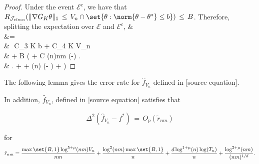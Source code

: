 \documentclass[twoside,11pt]{article}
\makeatletter
\newcommand{\rev}[1]{{\color{revisionred}#1}}
\newcommand{\discardlabel}[1]{}
\newcommand{\discardtwo}[2]{}
\newcommand{\legacyref}[1]{\textup{[source ref.]}}
\newcommand{\legacyeqref}[1]{\textup{[source equation]}}
\newenvironment{legacycomparison}{%
  \begingroup\color{legacygray}%
  \let\label\discardlabel
  \let\originallabel\discardlabel
  \let\ref\legacyref
  \let\pageref\legacyref
  \let\eqref\legacyeqref
  \let\cref\legacyref
  \let\Cref\legacyref
  \let\autoref\legacyref
  \let\aliasref\discardtwo
}{\endgroup}
\newcommand{\aliasref}[2]{%
  \@ifundefined{r@#2}{}{%
    \expandafter\let\csname r@#1\expandafter\endcsname\csname r@#2\endcsname}}
\makeatother
\begin{document}
\begin{legacycomparison}
\begin{proof}
Under the event $\mathcal{E}^c$, we have that $R_{\mathcal{J}_{elmn}} ( \|\nabla{G_K} \theta\|_1 \,\leq\, V_n\cap \set{\theta: \norm{\theta-\theta^*} \leq  b}) \,\leq\, B$. Therefore, splitting the expectation over $\mathcal{E}$ and $\mathcal{E}^c$, 
\bea 
&   \\ &=\\
&\,\leq\, 
C_3  K b + C_4  K V_n \\
& \quad +  B  \cdot \left( + C \log(n)nm \exp\left(-\right) \right. \\ & \left. \quad +  +  \log(n) \exp\left(- \right)  + \right)
\bea 


\end{proof}




\rev{The following lemma} gives the error rate for $\hat{f}_{V_n}$ defined in \eqref{np_knn2}. 



    



\begin{lemma}
\label{knn_f}
In addition, \( \hat{f}_{V_n} \), defined in \eqref{np_knn2} satisfies that

\[
\Delta^2(\hat{f}_{V_n} - f^*) \,=\, O_p(\tilde{r}_{nm})
\]

for
\[
\tilde{r}_{nm} =  \frac{ \max\set{B,1} \log^{5+\mu}(nm)V_n}{nm} + \frac{\log^2(nm)\max\set{B,1}}{n}
+ \frac{d \log^{1+\mu}(n) \log(T_n)}{n} + \frac{\log^{2+\mu}(nm)}{(nm)^{1/d}}.
\]
\end{lemma}


\end{legacycomparison}
\end{document}
